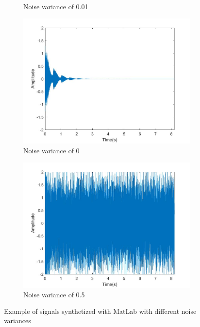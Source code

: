 \begin{figure}[]
\begin{subfigure}{0.45\textwidth}
        \caption{Noise variance of 0.01}{}
    \end{subfigure}
    \begin{subfigure}{0.45\textwidth}
        \centering
        \includegraphics[width=\linewidth]{Chapters/6CHP/Figures/signal3.jpg}
        \caption{Noise variance of 0}{}
    \end{subfigure}
    \begin{subfigure}{0.45\textwidth}
        \centering
        \includegraphics[width=\linewidth]{Chapters/6CHP/Figures/signal4.jpg}
        \caption{Noise variance of 0.5}{}
    \end{subfigure}
    \caption{Example of signals synthetized with MatLab with different noise variances}{}
     \label{fig:synthetizedSignal}
 \end{figure}
